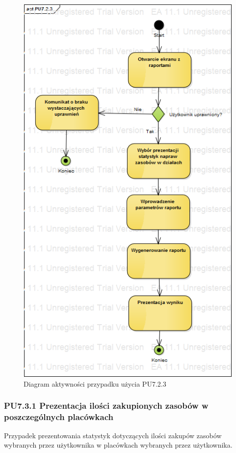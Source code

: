 \begin{figure}[h!]
	\centering
	\includegraphics[scale=0.6]{img/diagrams/activityDiagrams/PU723}
	\caption{Diagram aktywności przypadku użycia PU7.2.3 \label{fig:labelADPU7.2.3}}
\end{figure}

\subsubsection{PU7.3.1 Prezentacja ilości zakupionych zasobów w poszczególnych placówkach}
Przypadek prezentowania statystyk dotyczących ilości zakupów zasobów wybranych przez użytkownika w placówkach wybranych przez użytkownika.

